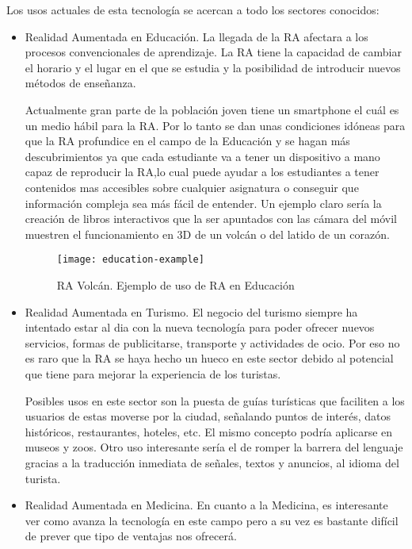 Los usos actuales de esta tecnología se acercan a todo los sectores conocidos:

\begin{itemize}
	\item Realidad Aumentada en Educación. La llegada de la RA afectara a los procesos convencionales de aprendizaje. La RA tiene la capacidad de cambiar el horario y el lugar en el que se estudia y la posibilidad de introducir nuevos métodos de enseñanza. 
	
	Actualmente gran parte de la población joven tiene un smartphone el cuál es un medio hábil para la RA. Por lo tanto se dan unas condiciones idóneas para que la RA profundice en el campo de la Educación y se hagan más descubrimientos ya que cada estudiante va a tener un dispositivo a mano capaz de reproducir la RA,lo cual puede ayudar a los estudiantes a tener contenidos mas accesibles sobre cualquier asignatura o conseguir que información compleja sea más fácil de entender. Un ejemplo claro sería la creación de libros interactivos que la ser apuntados con las cámara del móvil muestren el funcionamiento en 3D de un volcán o del latido de un corazón.

	\begin{figure}[h]
		\centering
		\texttt{[image: education-example]}
		\caption{RA Volcán. Ejemplo de uso de RA en Educación }
		\label{fig:education-example}
	\end{figure}

	\item Realidad Aumentada en Turismo. El negocio del turismo siempre ha intentado estar al dia con la nueva tecnología para poder ofrecer nuevos servicios, formas de publicitarse, transporte y actividades de ocio. Por eso no es raro que la RA se haya hecho un hueco en este sector debido al potencial que tiene para mejorar la experiencia de los turistas. 
	
	Posibles usos en este sector son la puesta de guías turísticas que faciliten a los usuarios de estas moverse por la ciudad, señalando puntos de interés, datos históricos, restaurantes, hoteles, etc. El mismo concepto podría aplicarse en museos y zoos. Otro uso interesante sería el de romper la barrera del lenguaje gracias a la traducción inmediata de señales, textos y anuncios, al idioma del turista. 

	\item Realidad Aumentada en Medicina. En cuanto a la Medicina, es interesante ver como avanza la tecnología en este campo pero a su vez es bastante difícil de prever que tipo de ventajas nos ofrecerá.
	

\end{itemize}
